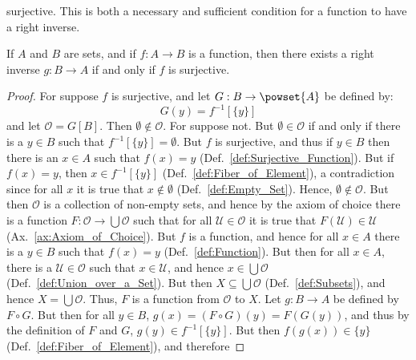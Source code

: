         surjective. This is both a necessary and sufficient condition for a
        function to have a right inverse.
        \begin{theorem}
            \label{thm:Right_Inv_iff_Surj}%
            If $A$ and $B$ are sets, and if $f:A\rightarrow{B}$ is a function,
            then there exists a right inverse $g:B\rightarrow{A}$ if and only
            if $f$ is surjective.
        \end{theorem}
        \begin{proof}
            For suppose $f$ is surjective, and let
            $G:B\rightarrow\powset{A}$ be defined by:
            \begin{equation}
                G(y)=f^{\minus{1}}[\{y\}]
            \end{equation}
            and let $\mathcal{O}=G[B]$. Then $\emptyset\notin\mathcal{O}$. For
            suppose not. But $\emptyset\in\mathcal{O}$ if and only if there is a
            $y\in{B}$ such that $f^{\minus{1}}[\{y\}]=\emptyset$. But $f$ is
            surjective, and thus if $y\in{B}$ then there is an $x\in{A}$ such
            that $f(x)=y$ (Def.~\ref{def:Surjective_Function}). But if $f(x)=y$,
            then $x\in{f}^{\minus{1}}[\{y\}]$ (Def.~\ref{def:Fiber_of_Element}),
            a contradiction since for all $x$ it is true that $x\notin\emptyset$
            (Def.~\ref{def:Empty_Set}). Hence, $\emptyset\notin\mathcal{O}$.
            But then $\mathcal{O}$ is a collection of non-empty sets, and hence
            by the axiom of choice there is a function
            $F:\mathcal{O}\rightarrow\bigcup\mathcal{O}$ such that for all
            $\mathcal{U}\in\mathcal{O}$ it is true that
            $F(\mathcal{U})\in\mathcal{U}$ (Ax.~\ref{ax:Axiom_of_Choice}). But
            $f$ is a function, and hence for all $x\in{A}$ there is a $y\in{B}$
            such that $f(x)=y$ (Def.~\ref{def:Function}). But then for all
            $x\in{A}$, there is a $\mathcal{U}\in\mathcal{O}$ such that
            $x\in\mathcal{U}$, and hence $x\in\bigcup\mathcal{O}$
            (Def.~\ref{def:Union_over_a_Set}). But then
            $X\subseteq\bigcup\mathcal{O}$ (Def.~\ref{def:Subsets}), and hence
            $X=\bigcup\mathcal{O}$. Thus, $F$ is a function from $\mathcal{O}$
            to $X$. Let $g:B\rightarrow{A}$ be defined by $F\circ{G}$. But then
            for all $y\in{B}$, $g(x)=(F\circ{G})(y)=F(G(y))$, and thus by the
            definition of $F$ and $G$, $g(y)\in{f}^{\minus{1}}[\{y\}]$. But then
            $f(g(x))\in\{y\}$ (Def.~\ref{def:Fiber_of_Element}), and therefore

\end{proof}
